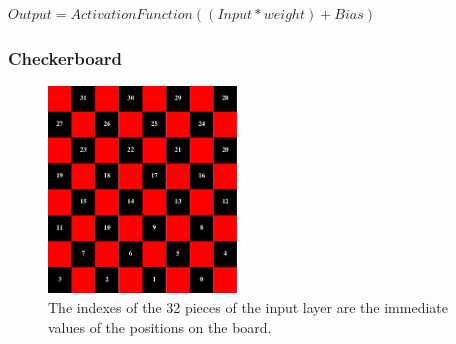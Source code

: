 \documentclass[aspectratio=169]{beamer}
\begin{document}
	\begin{frame}
		$Output = Activation Function ((Input* weight) + Bias)$
	\end{frame}

	\begin{frame}
		\frametitle{Checkerboard}
		\begin{figure}[ht!]
			\centering
			\includegraphics[width=50mm]{checkerboard.png}
			\caption{The indexes of the 32 pieces of the input layer are the immediate values of the positions on the board. \label{overflow}}
		\end{figure}
	\end{frame}
\end{document}
